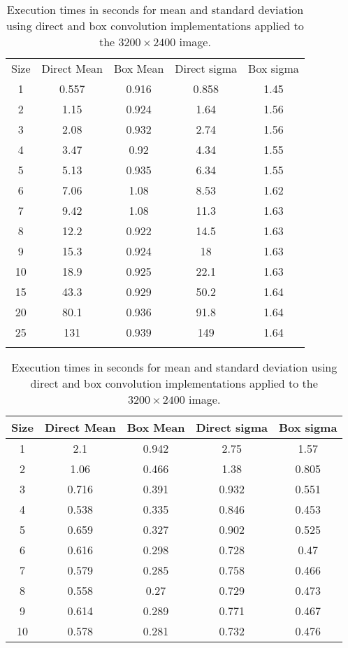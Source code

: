 \documentclass{InsightArticle}
\begin{document}
\begin{table}[phtb]
\centering
\small
\begin{tabular}{ccccc}
\hline
Size  &  Direct Mean &  Box Mean & Direct sigma & Box sigma\\
1	&	0.557	&	0.916	&	0.858	&	1.45	 \\
2	&	1.15	&	0.924	&	1.64	&	1.56	 \\
3	&	2.08	&	0.932	&	2.74	&	1.56	 \\
4	&	3.47	&	0.92	&	4.34	&	1.55	 \\
5	&	5.13	&	0.935	&	6.34	&	1.55	 \\
6	&	7.06	&	1.08	&	8.53	&	1.62	 \\
7	&	9.42	&	1.08	&	11.3	&	1.63	 \\
8	&	12.2	&	0.922	&	14.5	&	1.63	 \\
9	&	15.3	&	0.924	&	18	&	1.63	 \\
10	&	18.9	&	0.925	&	22.1	&	1.63	 \\
15	&	43.3	&	0.929	&	50.2	&	1.64	 \\
20	&	80.1	&	0.936	&	91.8	&	1.64	 \\
25	&	131	&	0.939	&	149	&	1.64	 \\
\hline
\hline
\small
\end{tabular}
\caption{Execution times in seconds for mean and standard deviation using direct and box convolution implementations applied to the $3200 \times 2400$ image.\label{tab:perfBoxConv}}
\end{table}


\begin{table}[phtb]
\centering
\small
\begin{tabular}{ccccc}
\hline
Size  &  Direct Mean &  Box Mean & Direct sigma & Box sigma\\
\hline
1	&	2.1	&	0.942	&	2.75	&	1.57	\\
2	&	1.06	&	0.466	&	1.38	&	0.805	\\
3	&	0.716	&	0.391	&	0.932	&	0.551	\\
4	&	0.538	&	0.335	&	0.846	&	0.453	\\
5	&	0.659	&	0.327	&	0.902	&	0.525	\\
6	&	0.616	&	0.298	&	0.728	&	0.47	\\
7	&	0.579	&	0.285	&	0.758	&	0.466	\\
8	&	0.558	&	0.27	&	0.729	&	0.473	\\
9	&	0.614	&	0.289	&	0.771	&	0.467	\\
10	&	0.578	&	0.281	&	0.732	&	0.476	\\
\hline
\hline
\end{tabular}
\caption{Execution times in seconds for mean and standard deviation using direct and box convolution implementations applied to the $3200 \times 2400$ image.\label{tab:perfBoxConv-threads}}
\end{table}
\end{document}
